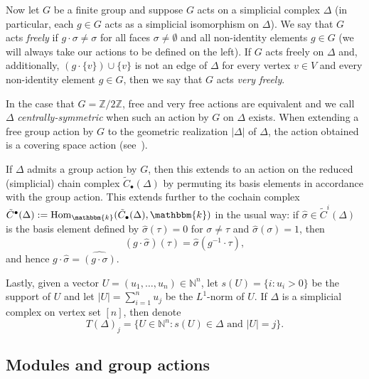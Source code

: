 \documentclass[ALCO,ThmDefs,Unicode]{cedram}
\DeclareMathOperator{\Hom}{Hom}
\newcommand{\field}{\mathbbm{k}}
\newcommand{\NN}{{\mathbb N}}
\newcommand{\ZZ}{{\mathbb Z}}
\begin{document}
Now let $G$ be a finite group and suppose $G$ acts on a simplicial complex $\Delta$ (in particular, each $g\in G$ acts as a simplicial isomorphism on $\Delta$). We say that $G$ acts \emph{freely} if $g\cdot \sigma \not= \sigma$ for all faces $\sigma\not=\emptyset$ and all non-identity elements $g\in G$ (we will always take our actions to be defined on the left). If $G$ acts freely on $\Delta$ and, additionally, $(g\cdot\{v\})\cup\{v\}$ is not an edge of $\Delta$ for every vertex $v\in V$ and every non-identity element $g\in G$, then we say that $G$ acts \emph{very freely}.

In the case that $G=\ZZ/2\ZZ$, free and very free actions are equivalent and we call $\Delta$ \emph{centrally-symmetric} when such an action by $G$ on $\Delta$ exists. When extending a free group action by $G$ to the geometric realization $|\Delta|$ of $\Delta$, the action obtained is a covering space action (see~\cite[Section~1.3]{Hatcher}).

If $\Delta$ admits a group action by $G$, then this extends to an action on the reduced (simplicial) chain complex $\tilde{C}_\bullet(\Delta)$ by permuting its basis elements in accordance with the group action. This extends further to the cochain complex $\tilde{C}^\bullet(\Delta):=\Hom_\field(\tilde{C}_\bullet(\Delta), \field)$ in the usual way: if $\hat{\sigma}\in \tilde{C}^i(\Delta)$ is the basis element defined by $\hat{\sigma}(\tau)=0$ for $\sigma\not=\tau$ and $\hat{\sigma}(\sigma)=1$, then
\[
(g\cdot\hat{\sigma})(\tau)=\hat{\sigma}(g^{-1}\cdot\tau),
\]
and hence $g\cdot\hat{\sigma}=\widehat{(g\cdot\sigma)}$.

Lastly, given a vector $U=(u_1, \ldots, u_n)\in \NN^n$, let $s(U)=\{i:u_i>0\}$ be the support of $U$ and let $|U|=\sum_{i=1}^n u_j$ be the $L^1$-norm of $U$. If $\Delta$ is a simplicial complex on vertex set $[n]$, then denote
\[
T(\Delta)_j=\{U\in \NN^n:\text{$s(U)\in \Delta$ and $|U|=j$}\}.
\]

\subsection{Modules and group actions}\label{sect:mods}
\end{document}
